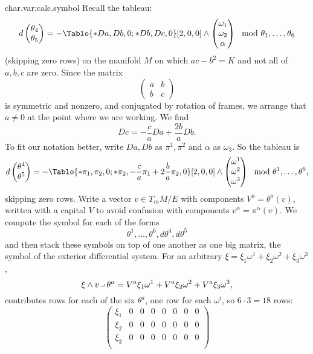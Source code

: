 \begin{answer}{char.var:calc.symbol}
Recall the tableau:
\[
d
\begin{pmatrix}
  \theta_4 \\
  \theta_5
\end{pmatrix}
=
-
\Tablo{*Da,Db,0;*Db,Dc,0}[2,0,0]
\wedge 
\begin{pmatrix}
  \pf_1 \\
  \pf_2 \\
  \alpha
\end{pmatrix}
\mod{\theta_1,\dots,\theta_6}
\]
(skipping zero rows) on the manifold \(M\) on which \(ac-b^2=K\) and not all of \(a,b,c\) are zero.
Since the matrix
\[
\begin{pmatrix}
a&b\\
b&c
\end{pmatrix}
\]
is symmetric and nonzero, and conjugated by rotation of frames, we arrange that \(a\ne 0\) at the point where we are working.
We find 
\[
Dc=-\frac{c}{a}Da+\frac{2b}{a}Db.
\]
To fit our notation better, write \(Da,Db\) as \(\pi^1,\pi^2\) and \(\alpha\) as \(\omega_3\).
So the tableau is
\[
d
\begin{pmatrix}
  \theta^4 \\
  \theta^5
\end{pmatrix}
=
-
\Tablo{*\pi_1,\pi_2,0;*\pi_2,-\frac{c}{a}\pi_1+2\frac{b}{a}\pi_2,0}[2,0,0]
\wedge 
\begin{pmatrix}
  \pf^1 \\
  \pf^2 \\
  \pf^3
\end{pmatrix}
\mod{\theta^1,\dots,\theta^6},
\]
skipping zero rows.
Write a vector \(v\in T_m M/E\) with components \(V^a=\theta^a(v)\), written with a capital \(V\) to avoid confusion with components \(v^{\alpha}=\pi^{\alpha}(v)\).  
We compute the symbol for each of the forms
\[
\theta^1,\dots,\theta^6,d\theta^4,d\theta^5
\]
and then stack these symbols on top of one another as one big matrix, the symbol of the exterior differential system.
For an arbitrary \(\xi=\xi_1\omega^1+\xi_2\omega^2+\xi_3\omega^3\),
\[
\xi\wedge v\hook\theta^a=V^a\xi_1\omega^1+V^a\xi_2\omega^2+V^a\xi_3\omega^3,
\]
contributes rows for each of the six \(\theta^a\), one row for each \(\omega^i\), so \(6\cdot 3=18\) rows:
\[
\begin{pmatrix}
\xi_1 & 0 & 0 & 0 & 0 & 0 & 0 & 0 \\
\xi_2 & 0 & 0 & 0 & 0 & 0 & 0 & 0 \\
\xi_3 & 0 & 0 & 0 & 0 & 0 & 0 & 0 \\

\end{pmatrix}\]
\end{answer}
